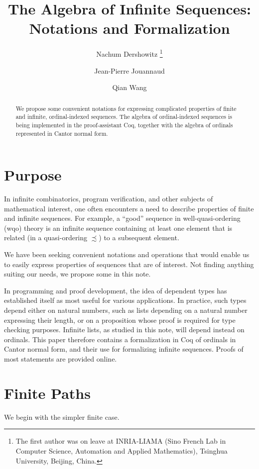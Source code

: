 \documentclass{llncs}
\title{The Algebra of Infinite Sequences:\\ Notations and Formalization}
\author{Nachum Dershowitz\inst{1}%
\thanks{The first author was on leave at INRIA-LIAMA
             (Sino French Lab in Computer Science, Automation
             and Applied Mathematics), Tsinghua University, Beijing, China.}
\and Jean-Pierre Jouannaud\inst{2,3}
\and Qian Wang\inst{2}}
\institute{School of Computer Science, Tel Aviv University, Ramat Aviv, Israel 
\and
School of Software, Tsinghua University, Beijing, China
\and
LIX, \'Ecole Polytechnique, Palaiseau, France}
\begin{document}
\maketitle

\begin{abstract}
We propose some convenient notations for expressing complicated
properties of finite and infinite, ordinal-indexed sequences. The
algebra of ordinal-indexed sequences is being implemented in the
proof-assistant Coq, together with the algebra of ordinals represented
in Cantor normal form.
\end{abstract}

\section{Purpose}

In infinite combinatorics, program verification, and other subjects of
mathematical interest, one often encounters a need to describe
properties of finite and infinite sequences.  For example, a ``good''
sequence in well-quasi-ordering (wqo) theory is an infinite sequence
containing at least one element that is related (in a quasi-ordering
$\precsim$) to a subsequent element.

We have been seeking convenient notations and operations that would
enable us to easily express properties of sequences that are of
interest.  Not finding anything suiting our needs, we propose some in
this note. 

In programming and proof development, the idea of dependent types
has established itself as most useful for various applications. In
practice, such types depend either on natural numbers, such as lists
depending on a natural number expressing their length, or on a
proposition whose proof is required for type checking
purposes. Infinite lists, as studied in this note, will depend instead
on ordinals. This paper therefore contains a formalization in Coq of
ordinals in Cantor normal form, and their use for formalizing infinite
sequences. Proofs of most statements are provided online.

\section{Finite Paths}

We begin with the simpler finite case.

\end{document}
